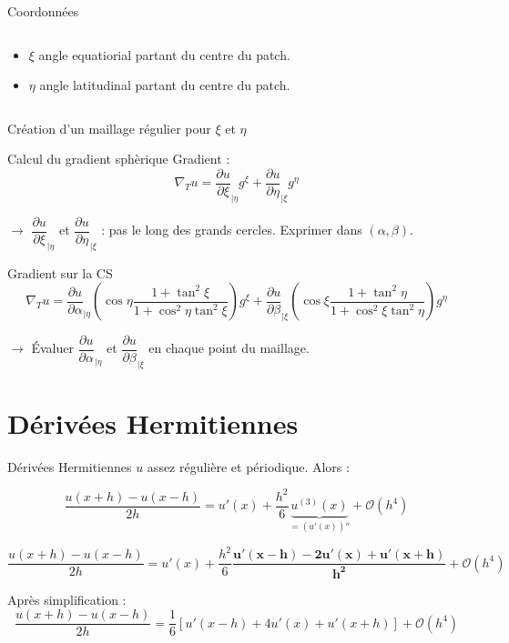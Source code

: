 \documentclass[11pt]{beamer}
\begin{document}
\begin{frame}{Coordonnées}
\begin{columns}
\begin{column}{5cm}
\begin{itemize}
\item $\xi$ angle equatiorial partant du centre du patch.

\item $\eta$ angle latitudinal partant du centre du patch.
\end{itemize}
\end{column}
\end{columns}

\begin{exampleblock}{}
Création d'un maillage régulier pour $\xi$ et $\eta$
\end{exampleblock}

\end{frame}


\begin{frame}{Calcul du gradient sphèrique}
Gradient :
$$\nabla_T u = \dfrac{\partial u}{\partial \xi}_{|\eta} g^\xi + \dfrac{\partial u}{\partial \eta}_{|\xi} g^\eta $$

$\rightarrow$ $\dfrac{\partial u}{\partial \xi}_{|\eta}$ et $\dfrac{\partial u}{\partial \eta}_{|\xi}$ : pas le long des grands cercles. Exprimer dans $(\alpha, \beta)$.
\pause
\begin{block}{Gradient sur la CS}
$$\nabla_T u = \frac{\partial u}{\partial \alpha}_{|\eta} \left( \cos \eta \dfrac{1+ \tan^2 \xi}{1 + \cos^2 \eta \tan^2 \xi} \right) g^\xi + \frac{\partial u}{\partial \beta}_{|\xi} \left( \cos \xi \dfrac{1+ \tan^2 \eta}{1 + \cos^2 \xi \tan^2 \eta} \right) g^\eta $$
\end{block}
\pause
$\rightarrow$ Évaluer $\dfrac{\partial u}{\partial \alpha}_{|\eta}$ et $\dfrac{\partial u}{\partial \beta}_{|\xi}$ en chaque point du maillage.
\end{frame}


\section{Dérivées Hermitiennes}
\begin{frame}{Dérivées Hermitiennes}
$u$ assez régulière et périodique. Alors :

$$\dfrac{u(x+h)-u(x-h)}{2h} = u'(x) + \dfrac{h^2}{6} \underbrace{u^{(3)}(x)}_{= \left( u'(x) \right)''} + \mathcal{O}\left( h^4 \right)$$

\pause

$$\dfrac{u(x+h)-u(x-h)}{2h} = u'(x) + \dfrac{h^2}{6} \mathbf{ \dfrac{u'(x-h) - 2 u'(x) + u'(x+h) }{h^2}} + \mathcal{O}\left( h^4 \right)$$

\pause

\begin{block}{}
Après simplification :
$$\dfrac{u(x+h)-u(x-h)}{2h} = \dfrac{1}{6} \left[ u'(x-h) + 4 u'(x) + u'(x+h) \right] + \mathcal{O}\left( h^4 \right)$$
\end{block}
\end{frame}
\end{document}

